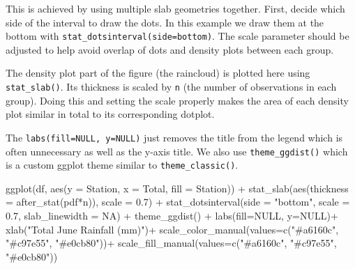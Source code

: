\documentclass[
  letterpaper,
  DIV=11,
  numbers=noendperiod]{scrreprt}
\newenvironment{Shaded}{\begin{snugshade}}{\end{snugshade}}
\newcommand{\AttributeTok}[1]{\textcolor[rgb]{0.40,0.45,0.13}{#1}}
\newcommand{\ConstantTok}[1]{\textcolor[rgb]{0.56,0.35,0.01}{#1}}
\newcommand{\FloatTok}[1]{\textcolor[rgb]{0.68,0.00,0.00}{#1}}
\newcommand{\FunctionTok}[1]{\textcolor[rgb]{0.28,0.35,0.67}{#1}}
\newcommand{\NormalTok}[1]{\textcolor[rgb]{0.00,0.23,0.31}{#1}}
\newcommand{\SpecialCharTok}[1]{\textcolor[rgb]{0.37,0.37,0.37}{#1}}
\newcommand{\StringTok}[1]{\textcolor[rgb]{0.13,0.47,0.30}{#1}}
\begin{document}
This is achieved by using multiple slab geometries together. First,
decide which side of the interval to draw the dots. In this example we
draw them at the bottom with
\texttt{stat\_dotsinterval(side=\textquotesingle{}bottom\textquotesingle{})}.
The scale parameter should be adjusted to help avoid overlap of dots and
density plots between each group.

The density plot part of the figure (the raincloud) is plotted here
using \texttt{stat\_slab()}. Its thickness is scaled by \texttt{n} (the
number of observations in each group). Doing this and setting the scale
properly makes the area of each density plot similar in total to its
corresponding dotplot.

The \texttt{labs(fill=NULL,\ y=NULL)} just removes the title from the
legend which is often unnecessary as well as the y-axis title. We also
use \texttt{theme\_ggdist()} which is a custom ggplot theme similar to
\texttt{theme\_classic()}.

\begin{Shaded}
\begin{Highlighting}[]
 \FunctionTok{ggplot}\NormalTok{(df, }\FunctionTok{aes}\NormalTok{(}\AttributeTok{y =}\NormalTok{ Station, }\AttributeTok{x =}\NormalTok{ Total, }\AttributeTok{fill =}\NormalTok{ Station)) }\SpecialCharTok{+}
  \FunctionTok{stat\_slab}\NormalTok{(}\FunctionTok{aes}\NormalTok{(}\AttributeTok{thickness =} \FunctionTok{after\_stat}\NormalTok{(pdf}\SpecialCharTok{*}\NormalTok{n)), }\AttributeTok{scale =} \FloatTok{0.7}\NormalTok{) }\SpecialCharTok{+}
  \FunctionTok{stat\_dotsinterval}\NormalTok{(}\AttributeTok{side =} \StringTok{"bottom"}\NormalTok{, }\AttributeTok{scale =} \FloatTok{0.7}\NormalTok{, }\AttributeTok{slab\_linewidth =} \ConstantTok{NA}\NormalTok{) }\SpecialCharTok{+}
  \FunctionTok{theme\_ggdist}\NormalTok{() }\SpecialCharTok{+}
  \FunctionTok{labs}\NormalTok{(}\AttributeTok{fill=}\ConstantTok{NULL}\NormalTok{, }\AttributeTok{y=}\ConstantTok{NULL}\NormalTok{)}\SpecialCharTok{+}
  \FunctionTok{xlab}\NormalTok{(}\StringTok{"Total June Rainfall (mm)"}\NormalTok{)}\SpecialCharTok{+}
  \FunctionTok{scale\_color\_manual}\NormalTok{(}\AttributeTok{values=}\FunctionTok{c}\NormalTok{(}\StringTok{"\#a6160c"}\NormalTok{, }\StringTok{"\#c97e55"}\NormalTok{, }\StringTok{"\#e0cb80"}\NormalTok{))}\SpecialCharTok{+}
  \FunctionTok{scale\_fill\_manual}\NormalTok{(}\AttributeTok{values=}\FunctionTok{c}\NormalTok{(}\StringTok{"\#a6160c"}\NormalTok{, }\StringTok{"\#c97e55"}\NormalTok{, }\StringTok{"\#e0cb80"}\NormalTok{))}
\end{Highlighting}
\end{Shaded}
\end{document}
